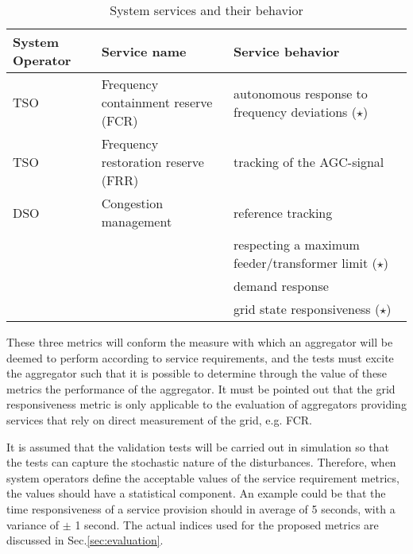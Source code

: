 \begin{table}[!t]%
\renewcommand{\arraystretch}{1.3}
\caption{System services and their behavior}
\label{tab:servmet}
\centering
\begin{tabularx}{\columnwidth}{p{1.0cm} X X}
\toprule
System Operator& Service name & Service behavior\\
\midrule
TSO & Frequency containment reserve (FCR) & autonomous response to frequency deviations ($\star$) \\
TSO & Frequency restoration reserve (FRR) & tracking of the AGC-signal\\
DSO & Congestion management         & reference tracking \\
    &                               & respecting a maximum feeder/transformer limit ($\star$) \\
    &                               & demand response \\
    &                               & grid state responsiveness ($\star$)\\
\bottomrule
\end{tabularx}
\end{table}

These three metrics will conform the measure with which an aggregator will be deemed to perform according to service requirements, and the tests must excite the aggregator such that it is possible to determine through the value of these metrics the performance of the aggregator. It must be pointed out that the grid responsiveness metric is only applicable to the evaluation of aggregators providing services that rely on direct measurement of the grid, e.g. FCR.

It is assumed that the validation tests will be carried out in simulation so that the tests can capture the stochastic nature of the disturbances. Therefore, when system operators define the acceptable values of the service requirement metrics, the values should have a statistical component. An example could be that the time responsiveness of a service provision should in average of 5 seconds, with a variance of $\pm$ 1 second. The actual indices used for the proposed metrics are discussed in Sec.\ref{sec:evaluation}.

